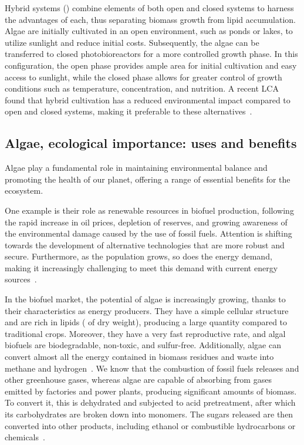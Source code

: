 Hybrid systems () combine elements of both open and closed systems to harness the advantages of each, thus separating biomass growth from lipid accumulation. Algae are initially cultivated in an open environment, such as ponds or lakes, to utilize sunlight and reduce initial costs. Subsequently, the algae can be transferred to closed photobioreactors for a more controlled growth phase. In this configuration, the open phase provides ample area for initial cultivation and easy access to sunlight, while the closed phase allows for greater control of growth conditions such as temperature,  concentration, and nutrition. A recent LCA found that hybrid cultivation has a reduced environmental impact compared to open and closed systems, making it preferable to these alternatives~\parencite{narala_Comparison_2016}.


\subsection{Algae, ecological importance: uses and benefits}
Algae play a fundamental role in maintaining environmental balance and promoting the health of our planet, offering a range of essential benefits for the ecosystem.

One example is their role as renewable resources in biofuel production, following the rapid increase in oil prices, depletion of reserves, and growing awareness of the environmental damage caused by the use of fossil fuels. Attention is shifting towards the development of alternative technologies that are more robust and secure. Furthermore, as the population grows, so does the energy demand, making it increasingly challenging to meet this demand with current energy sources~\parencite{faruk_role_2023}.

In the biofuel market, the potential of algae is increasingly growing, thanks to their characteristics as energy producers. They have a simple cellular structure and are rich in lipids ( of dry weight), producing a large quantity compared to traditional crops. Moreover, they have a very fast reproductive rate, and algal biofuels are biodegradable, non-toxic, and sulfur-free. Additionally, algae can convert almost all the energy contained in biomass residues and waste into methane and hydrogen~\parencite{suganya_Macroalgae_2016}. We know that the combustion of fossil fuels releases  and other greenhouse gases, whereas algae are capable of absorbing  from gases emitted by factories and power plants, producing significant amounts of biomass. To convert it, this is dehydrated and subjected to acid pretreatment, after which its carbohydrates are broken down into monomers. The sugars released are then converted into other products, including ethanol or combustible hydrocarbons or chemicals~\parencite{salami_AlgaeBased_2021}.

